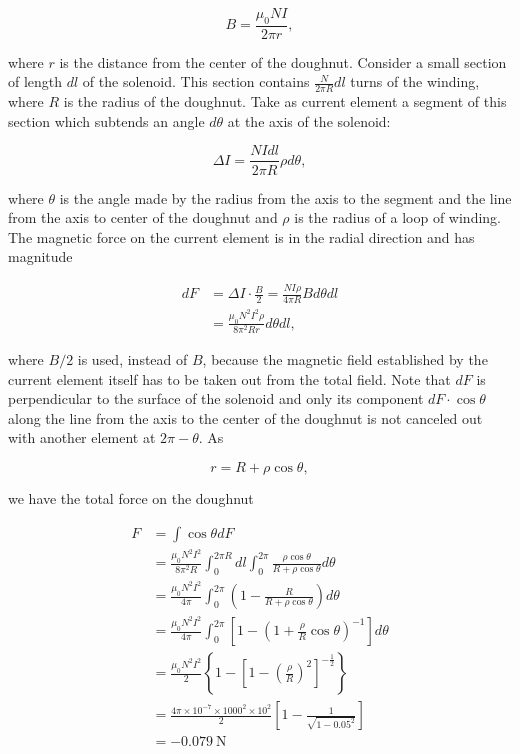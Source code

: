 \documentclass[10pt]{article}
\begin{document}
$$
B=\frac{\mu_{0} N I}{2 \pi r},
$$

where $r$ is the distance from the center of the doughnut. Consider a small section of length $d l$ of the solenoid. This section contains $\frac{N}{2 \pi R} d l$ turns of the winding, where $R$ is the radius of the doughnut. Take as current element a segment of this section which subtends an angle $d \theta$ at the axis of the solenoid:

$$
\Delta I=\frac{N I d l}{2 \pi R} \rho d \theta,
$$

where $\theta$ is the angle made by the radius from the axis to the segment and the line from the axis to center of the doughnut and $\rho$ is the radius of a loop of winding. The magnetic force on the current element is in the radial direction and has magnitude

$$
\begin{aligned}
d F &=\Delta I \cdot \frac{B}{2}=\frac{N I \rho}{4 \pi R} B d \theta d l \\
&=\frac{\mu_{0} N^{2} I^{2} \rho}{8 \pi^{2} R r} d \theta d l,
\end{aligned}
$$

where $B / 2$ is used, instead of $B$, because the magnetic field established by the current element itself has to be taken out from the total field. Note that $d F$ is perpendicular to the surface of the solenoid and only its component $d F \cdot \cos \theta$ along the line from the axis to the center of the doughnut is not canceled out with another element at $2 \pi-\theta$. As

$$
r=R+\rho \cos \theta,
$$

we have the total force on the doughnut

$$
\begin{aligned}
F &=\int \cos \theta d F \\
&=\frac{\mu_{0} N^{2} I^{2}}{8 \pi^{2} R} \int_{0}^{2 \pi R} d l \int_{0}^{2 \pi} \frac{\rho \cos \theta}{R+\rho \cos \theta} d \theta \\
&=\frac{\mu_{0} N^{2} I^{2}}{4 \pi} \int_{0}^{2 \pi}\left(1-\frac{R}{R+\rho \cos \theta}\right) d \theta \\
&=\frac{\mu_{0} N^{2} I^{2}}{4 \pi} \int_{0}^{2 \pi}\left[1-\left(1+\frac{\rho}{R} \cos \theta\right)^{-1}\right] d \theta \\
&=\frac{\mu_{0} N^{2} I^{2}}{2}\left\{1-\left[1-\left(\frac{\rho}{R}\right)^{2}\right]^{-\frac{1}{2}}\right\} \\
&=\frac{4 \pi \times 10^{-7} \times 1000^{2} \times 10^{2}}{2}\left[1-\frac{1}{\sqrt{1-0.05^{2}}}\right] \\
&=-0.079 \mathrm{~N}
\end{aligned}
$$
\end{document}

